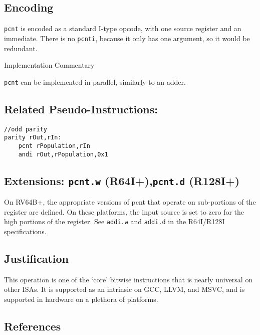 \subsection{Encoding}\label{encoding-1}



\texttt{pcnt} is encoded as a standard I-type opcode, with one source
register and an immediate. There is no \texttt{pcnti}, because it only
has one argument, so it would be redundant.

Implementation Commentary

\texttt{pcnt} can be implemented in parallel, similarly to an adder.

\subsection{Related
Pseudo-Instructions:}\label{related-pseudo-instructions-1}

\begin{verbatim}
//odd parity
parity rOut,rIn:
    pcnt rPopulation,rIn
    andi rOut,rPopulation,0x1
\end{verbatim}

\subsection{\texorpdfstring{Extensions: \texttt{pcnt.w}
(R64I+),\texttt{pcnt.d}
(R128I+)}{Extensions: pcnt.w (R64I+),pcnt.d (R128I+)}}\label{extensions-pcnt.w-r64ipcnt.d-r128i}

On RV64B+, the appropriate versions of pcnt that operate on sub-portions
of the register are defined. On these platforms, the input source is set
to zero for the high portions of the register. See \texttt{addi.w} and
\texttt{addi.d} in the R64I/R128I specifications.

\subsection{Justification}\label{justification}

This operation is one of the `core' bitwise instructions that is nearly
universal on other ISAs. It is supported as an intrinsic on GCC, LLVM,
and MSVC, and is supported in hardware on a plethora of platforms.

\subsection{References}\label{references-1}

